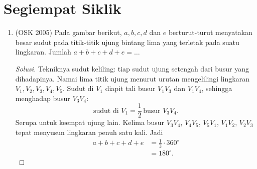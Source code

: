 \documentclass[12pt]{scrartcl}
\begin{document}
\section{Segiempat Siklik}

\begin{enumerate}[resume]

	\item (OSK 2005)
	Pada gambar berikut, $a, b, c, d$ dan $e$ berturut-turut menyatakan
	besar sudut pada titik-titik ujung bintang lima yang terletak pada
	suatu lingkaran. Jumlah $a+b+c+d+e=\dots$

\begin{center}
\end{center}
	\begin{proof}[Solusi]
	Tekniknya sudut keliling: tiap sudut ujung setengah dari busur
	yang dihadapinya. Namai lima titik ujung menurut urutan
	mengelilingi lingkaran $V_{1}, V_{2}, V_{3}, V_{4}, V_{5}$.
	Sudut di $V_{1}$ diapit tali busur $V_{1}V_{3}$ dan $V_{1}V_{4}$,
	sehingga menghadap busur $V_{3}V_{4}$:
	\[ \text{sudut di } V_{1} = \frac12\,\text{busur } V_{3}V_{4}. \]
	Serupa untuk keempat ujung lain. Kelima busur
	$V_{3}V_{4}$, $V_{4}V_{5}$, $V_{5}V_{1}$, $V_{1}V_{2}$, $V_{2}V_{3}$
	tepat menyusun lingkaran penuh satu kali. Jadi
	\begin{align*}
	a + b + c + d + e &= \frac12 \cdot 360^\circ \\
	&= 180^\circ.
	\end{align*}
	\end{proof}


\end{enumerate}
\end{document}
